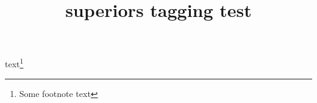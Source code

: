 \documentclass{article}
\title{superiors tagging test}
\begin{document}
\def\thefootnote{abcdef123456}
text\footnote{Some footnote text}
\end{document}
